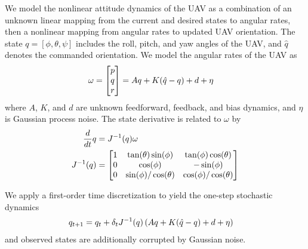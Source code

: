 We model the nonlinear attitude dynamics of the UAV as a combination of an unknown linear mapping from the current and desired states to angular rates, then a nonlinear mapping from angular rates to updated UAV orientation. The state $q = [\phi, \theta, \psi]$ includes the roll, pitch, and yaw angles of the UAV, and $\hat{q}$ denotes the commanded orientation. We model the angular rates of the UAV as
\begin{align}
    \omega = \begin{bmatrix}p \\ q \\ r\end{bmatrix} &= Aq + K (\hat{q} - q) + d + \eta
\end{align}
where $A$, $K$, and $d$ are unknown feedforward, feedback, and bias dynamics, and $\eta$ is Gaussian process noise. The state derivative is related to $\omega$ by
\begin{align}
    \frac{d }{d t}q & = J^{-1}(q) \omega                                    \\
    J^{-1}(q)  & = \begin{bmatrix}
    1          & \tan(\theta)\sin(\phi)    & \tan(\phi)\cos(\theta)    \\
    0          & \cos(\phi)                & -\sin(\phi)               \\
    0          & \sin(\phi) / \cos(\theta) & \cos(\phi) / \cos(\theta)
    \end{bmatrix}
\end{align}

We apply a first-order time discretization to yield the one-step stochastic dynamics
\begin{align*}
    q_{t+1} & = q_t + \delta_t J^{-1}(q) \left( Aq + K (\hat{q} - q) + d + \eta \right)
\end{align*}
and observed states are additionally corrupted by Gaussian noise.